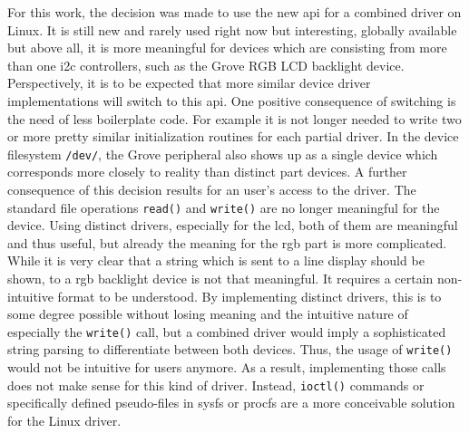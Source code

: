 For this work, the decision was made to use the new \ac{api} for a combined driver on Linux.
It is still new and rarely used right now but interesting, globally available but above all, it is more meaningful for devices which are consisting from more than one \ac{i2c} controllers, such as the Grove RGB LCD backlight device.
Perspectively, it is to be expected that more similar device driver implementations will switch to this \ac{api}.
One positive consequence of switching is the need of less boilerplate code.
For example it is not longer needed to write two or more pretty similar initialization routines for each partial driver.
In the device filesystem \texttt{/dev/}, the Grove peripheral also shows up as a single device which corresponds more closely to reality than distinct part devices.
A further consequence of this decision results for an user's access to the driver.
The standard file operations \texttt{read()} and \texttt{write()} are no longer meaningful for the device.
Using distinct drivers, especially for the \ac{lcd}, both of them are meaningful and thus useful, but already the meaning for the \ac{rgb} part is more complicated.
While it is very clear that a string which is sent to a line display should be shown, to a \ac{rgb} backlight device is not that meaningful.
It requires a certain non-intuitive format to be understood.
By implementing distinct drivers, this is to some degree possible without losing meaning and the intuitive nature of especially the \texttt{write()} call, but a combined driver would imply a sophisticated string parsing to differentiate between both devices.
Thus, the usage of \texttt{write()} would not be intuitive for users anymore.
As a result, implementing those calls does not make sense for this kind of driver.
Instead, \texttt{ioctl()} commands or specifically defined pseudo-files in sysfs or procfs are a more conceivable solution for the Linux driver.

